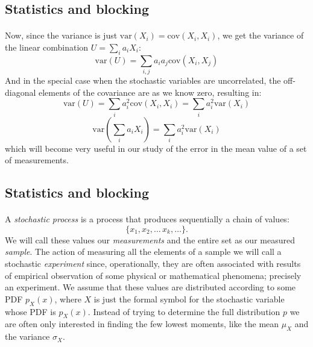 \documentclass[%
twoside,                 %
final,                   %
10pt]{article}
\begin{document}
\subsection{Statistics and blocking}

\paragraph{}
Now, since the variance is just $\mathrm{var}(X_i) = \mathrm{cov}(X_i, X_i)$, we get
the variance of the linear combination $U = \sum_i a_i X_i$:
\begin{equation}
\mathrm{var}(U) = \sum_{i,j}a_i a_j \mathrm{cov}(X_i, X_j)
\label{eq:variance_linear_combination}
\end{equation}
And in the special case when the stochastic variables are
uncorrelated, the off-diagonal elements of the covariance are as we
know zero, resulting in:
\[
\mathrm{var}(U) = \sum_i a_i^2 \mathrm{cov}(X_i, X_i) = \sum_i a_i^2 \mathrm{var}(X_i)
\]
\[
\mathrm{var}(\sum_i a_i X_i) = \sum_i a_i^2 \mathrm{var}(X_i)
\]
which will become very useful in our study of the error in the mean
value of a set of measurements.



\subsection{Statistics and blocking}

\paragraph{}
A \emph{stochastic process} is a process that produces sequentially a
chain of values:
\[
\{x_1, x_2,\dots\,x_k,\dots\}.
\]
We will call these
values our \emph{measurements} and the entire set as our measured
\emph{sample}.  The action of measuring all the elements of a sample
we will call a stochastic \emph{experiment} since, operationally,
they are often associated with results of empirical observation of
some physical or mathematical phenomena; precisely an experiment. We
assume that these values are distributed according to some 
PDF $p_X^{\phantom X}(x)$, where $X$ is just the formal symbol for the
stochastic variable whose PDF is $p_X^{\phantom X}(x)$. Instead of
trying to determine the full distribution $p$ we are often only
interested in finding the few lowest moments, like the mean
$\mu_X^{\phantom X}$ and the variance $\sigma_X^{\phantom X}$.
\end{document}
